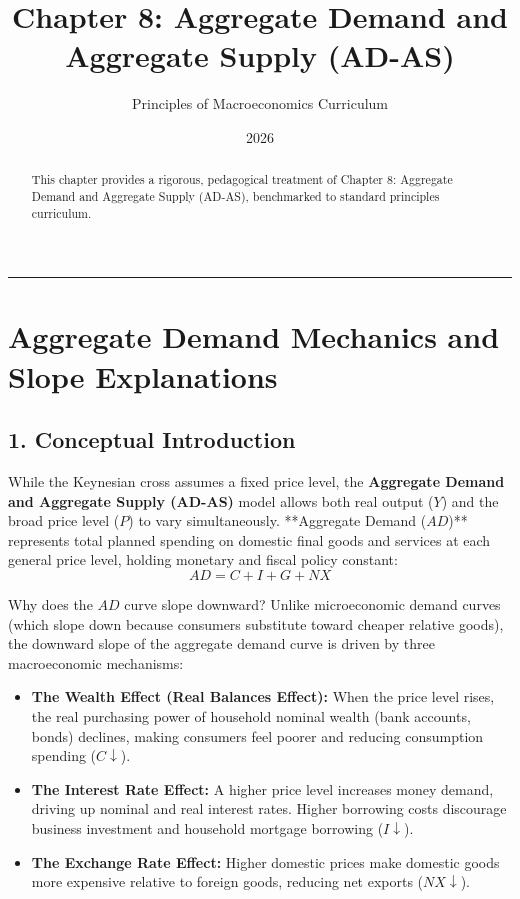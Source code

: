 \documentclass[11pt,letterpaper]{article}
\begin{document}
\title{\Huge\bfseries\color{SlateBlue} Chapter 8: Aggregate Demand and Aggregate Supply (AD-AS)}
\author{\large Principles of Macroeconomics Curriculum}
\date{2026}
\maketitle

\thispagestyle{plain}

\begin{abstract}
This chapter provides a rigorous, pedagogical treatment of Chapter 8: Aggregate Demand and Aggregate Supply (AD-AS), benchmarked to standard principles curriculum.
\end{abstract}

\tableofcontents
\vspace{1.5em}
\hrule
\vspace{1.5em}

\section{Aggregate Demand Mechanics and Slope Explanations}

\subsection*{1. Conceptual Introduction}
While the Keynesian cross assumes a fixed price level, the \textbf{Aggregate Demand and Aggregate Supply (AD-AS)} model allows both real output ($Y$) and the broad price level ($P$) to vary simultaneously. **Aggregate Demand ($AD$)** represents total planned spending on domestic final goods and services at each general price level, holding monetary and fiscal policy constant:
\begin{equation}
AD = C + I + G + NX
\end{equation}

Why does the $AD$ curve slope downward? Unlike microeconomic demand curves (which slope down because consumers substitute toward cheaper relative goods), the downward slope of the aggregate demand curve is driven by three macroeconomic mechanisms:
\begin{itemize}
    \item \textbf{The Wealth Effect (Real Balances Effect):} When the price level rises, the real purchasing power of household nominal wealth (bank accounts, bonds) declines, making consumers feel poorer and reducing consumption spending ($C \downarrow$).
    \item \textbf{The Interest Rate Effect:} A higher price level increases money demand, driving up nominal and real interest rates. Higher borrowing costs discourage business investment and household mortgage borrowing ($I \downarrow$).
    \item \textbf{The Exchange Rate Effect:} Higher domestic prices make domestic goods more expensive relative to foreign goods, reducing net exports ($NX \downarrow$).
\end{itemize}
\end{document}
